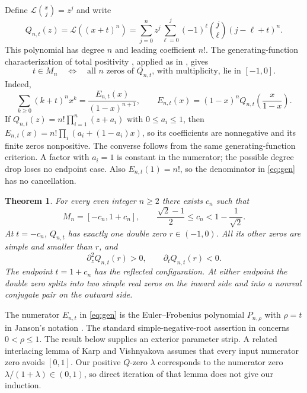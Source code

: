 \documentclass[11pt]{article}
\newtheorem{theorem}{Theorem}[section]
\theoremstyle{remark}
\newcommand{\Lop}{\mathcal{L}}
\begin{document}
Define $\Lop\binom{x}{j}=z^j$ and write
\begin{equation}\label{eq:Q}
 Q_{n,t}(z)=\Lop((x+t)^n)
 =\sum_{j=0}^{n}z^j\sum_{\ell=0}^{j}
       (-1)^\ell\binom{j}{\ell}(j-\ell+t)^n.
\end{equation}
This polynomial has degree $n$ and leading coefficient $n!$.
The generating-function characterization of total positivity
\cite{Edrei1953}, applied as in \cite[Section 1]{Vishnyakova2026}, gives
\begin{equation}\label{eq:criterion}
 t\in M_n\quad\Longleftrightarrow\quad
 \text{all $n$ zeros of $Q_{n,t}$, with multiplicity, lie in $[-1,0]$}.
\end{equation}
Indeed,
\begin{equation}\label{eq:gen}
 \sum_{k\ge0}(k+t)^n x^k
 =\frac{E_{n,t}(x)}{(1-x)^{n+1}},\qquad
 E_{n,t}(x)=(1-x)^nQ_{n,t}\!\left(\frac{x}{1-x}\right).
\end{equation}
If $Q_{n,t}(z)=n!\prod_{i=1}^n(z+a_i)$ with $0\le a_i\le1$, then
$E_{n,t}(x)=n!\prod_i(a_i+(1-a_i)x)$, so its coefficients are nonnegative
and its finite zeros nonpositive. The converse follows from the same
generating-function criterion. A factor with $a_i=1$ is constant in the
numerator; the possible degree drop loses no endpoint case. Also
$E_{n,t}(1)=n!$, so the denominator in \eqref{eq:gen} has no cancellation.

\begin{theorem}\label{thm:main}
For every even integer $n\ge2$ there exists $c_n$ such that
\begin{equation}\label{eq:main}
 M_n=[-c_n,1+c_n],\qquad
 \frac{\sqrt2-1}{2}\le c_n<1-\frac1{\sqrt2}.
\end{equation}
At $t=-c_n$, $Q_{n,t}$ has exactly one double zero $r\in(-1,0)$.
All its other zeros are simple and smaller than $r$, and
\begin{equation}\label{eq:collision-signs}
 \partial_z^2Q_{n,t}(r)>0,\qquad \partial_tQ_{n,t}(r)<0.
\end{equation}
The endpoint $t=1+c_n$ has the reflected configuration. At either
endpoint the double zero splits into two simple real zeros on the inward
side and into a nonreal conjugate pair on the outward side.
\end{theorem}

The numerator $E_{n,t}$ in \eqref{eq:gen} is the Euler--Frobenius
polynomial $P_{n,\rho}$ with $\rho=t$ in Janson's notation
\cite[Section 1]{Janson2013}. The standard simple-negative-root assertion in
\cite[Remark A.2]{Janson2013} concerns $0<\rho\le1$.
The result below supplies an exterior parameter strip. A related
interlacing lemma of Karp and Vishnyakova
\cite[Lemma 3]{KarpVishnyakova2025} assumes that every input numerator
zero avoids $[0,1]$. Our positive $Q$-zero $\lambda$ corresponds to the
numerator zero $\lambda/(1+\lambda)\in(0,1)$, so direct iteration of that
lemma does not give our induction.
\end{document}
